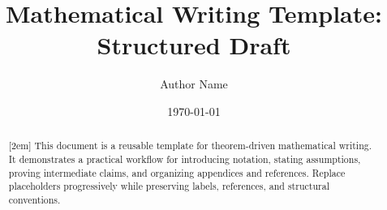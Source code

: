 \documentclass{article}
\title{Mathematical Writing Template: Structured Draft}
\author{Author Name}
\date{\today}
\begin{document}
\maketitle

\begin{abstract}[2em]
This document is a reusable template for theorem-driven mathematical writing. It demonstrates a practical workflow for introducing notation, stating assumptions, proving intermediate claims, and organizing appendices and references. Replace placeholders progressively while preserving labels, references, and structural conventions.
\end{abstract}


\tableofcontents




\printbibliography
\end{document}
